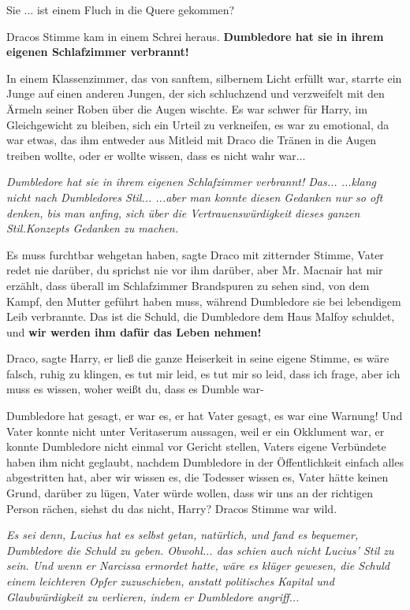 \glqq{}Sie ... ist einem Fluch in die Quere gekommen?\grqq{}

Dracos Stimme kam in einem Schrei heraus. \glqq{}\textbf{Dumbledore hat sie in
ihrem eigenen Schlafzimmer verbrannt!}\grqq{}

In einem Klassenzimmer, das von sanftem, silbernem Licht erfüllt war, starrte
ein Junge auf einen anderen Jungen, der sich schluchzend und verzweifelt mit den
Ärmeln seiner Roben über die Augen wischte. Es war schwer für Harry, im
Gleichgewicht zu bleiben, sich ein Urteil zu verkneifen, es war zu emotional, da
war etwas, das ihm entweder aus Mitleid mit Draco die Tränen in die Augen
treiben wollte, oder er wollte wissen, dass es nicht wahr war...

\emph{Dumbledore hat sie in ihrem eigenen Schlafzimmer verbrannt! Das...
...klang nicht nach Dumbledores Stil... ...aber man konnte diesen Gedanken nur
so oft denken, bis man anfing, sich über die Vertrauenswürdigkeit dieses ganzen
\glqq{}Stil\grqq{}.Konzepts Gedanken zu machen.}

\glqq{}Es muss furchtbar wehgetan haben\grqq{}, sagte Draco mit zitternder
Stimme, \glqq{}Vater redet nie darüber, du sprichst nie vor ihm darüber, aber Mr.
Macnair hat mir erzählt, dass überall im Schlafzimmer Brandspuren zu sehen sind,
von dem Kampf, den Mutter geführt haben muss, während Dumbledore sie bei
lebendigem Leib verbrannte. Das ist die Schuld, die Dumbledore dem Haus Malfoy
schuldet, und \textbf{wir werden ihm dafür das Leben nehmen!}\grqq{}

\glqq{}Draco\grqq{}, sagte Harry, er ließ die ganze Heiserkeit in seine eigene
Stimme, es wäre falsch, ruhig zu klingen, \glqq{}es tut mir leid, es tut mir so
leid, dass ich frage, aber ich muss es wissen, woher weißt du, dass es Dumble
war-\grqq{}

\glqq{}Dumbledore hat gesagt, er war es, er hat Vater gesagt, es war eine
Warnung! Und Vater konnte nicht unter Veritaserum aussagen, weil er ein
Okklument war, er konnte Dumbledore nicht einmal vor Gericht stellen, Vaters
eigene Verbündete haben ihm nicht geglaubt, nachdem Dumbledore in der
Öffentlichkeit einfach alles abgestritten hat, aber wir wissen es, die Todesser
wissen es, Vater hätte keinen Grund, darüber zu lügen, Vater würde wollen, dass
wir uns an der richtigen Person rächen, siehst du das nicht, Harry?\grqq{}
Dracos Stimme war wild.

\emph{Es sei denn, Lucius hat es selbst getan, natürlich, und fand es bequemer,
Dumbledore die Schuld zu geben. Obwohl... das schien auch nicht Lucius' Stil zu
sein. Und wenn er Narcissa ermordet hatte, wäre es klüger gewesen, die Schuld
einem leichteren Opfer zuzuschieben, anstatt politisches Kapital und
Glaubwürdigkeit zu verlieren, indem er Dumbledore angriff...}

